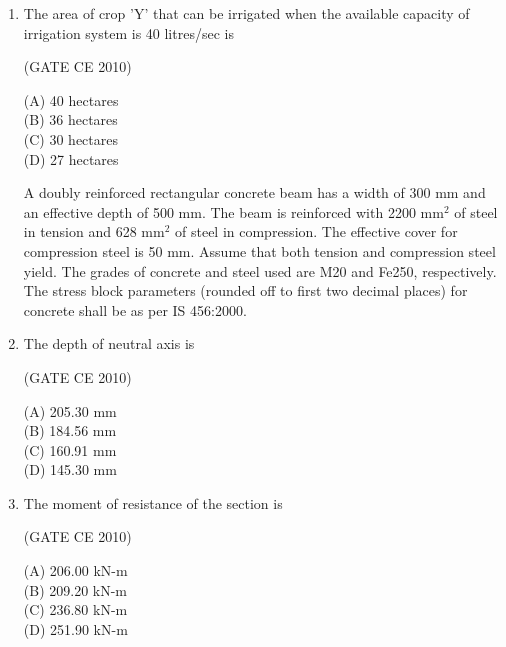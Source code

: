 \documentclass[journal,12pt,onecolumn]{exam}
\theoremstyle{remark}
\begin{document}
\begin{enumerate}
\setlength{\parskip}{0.5cm}
\noindent\item The area of crop 'Y' that can be irrigated when the available capacity of irrigation system is 40 litres/sec is

\setlength{\parskip}{0.5cm}

\hfill{(GATE CE 2010)}

\begin{multicols}{4}
\noindent(A) 40 hectares\\
(B) 36 hectares\\
(C) 30 hectares\\
(D) 27 hectares
\end{multicols}


A doubly reinforced rectangular concrete beam has a width of 300 mm and an effective depth of 500 mm. The beam is reinforced with 2200 mm\(^2\) of steel in tension and 628 mm\(^2\) of steel in compression. The effective cover for compression steel is 50 mm. Assume that both tension and compression steel yield. The grades of concrete and steel used are M20 and Fe250, respectively. The stress block parameters (rounded off to first two decimal places) for concrete shall be as per IS 456:2000.

\setlength{\parskip}{0.5cm}
\noindent\item The depth of neutral axis is

\setlength{\parskip}{0.5cm}

\hfill{(GATE CE 2010)}

\begin{multicols}{4}
\noindent(A) 205.30 mm\\
(B) 184.56 mm\\
(C) 160.91 mm\\
(D) 145.30 mm
\end{multicols}

\setlength{\parskip}{0.5cm}
\noindent\item The moment of resistance of the section is

\setlength{\parskip}{0.5cm}

\hfill{(GATE CE 2010)}

\begin{multicols}{4}
\noindent(A) 206.00 kN-m\\
(B) 209.20 kN-m\\
(C) 236.80 kN-m\\
(D) 251.90 kN-m
\end{multicols}


\end{enumerate}
\end{document}
